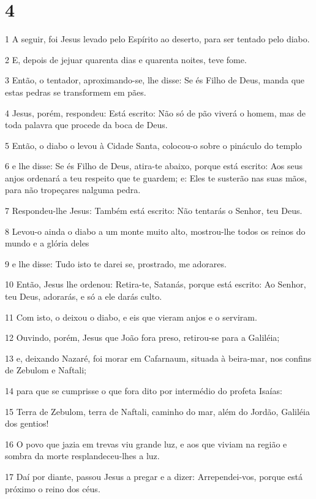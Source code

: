 \chapter{4}

\par 1 A seguir, foi Jesus levado pelo Espírito ao deserto, para ser tentado pelo diabo.
\par 2 E, depois de jejuar quarenta dias e quarenta noites, teve fome.
\par 3 Então, o tentador, aproximando-se, lhe disse: Se és Filho de Deus, manda que estas pedras se transformem em pães.
\par 4 Jesus, porém, respondeu: Está escrito: Não só de pão viverá o homem, mas de toda palavra que procede da boca de Deus.
\par 5 Então, o diabo o levou à Cidade Santa, colocou-o sobre o pináculo do templo
\par 6 e lhe disse: Se és Filho de Deus, atira-te abaixo, porque está escrito: Aos seus anjos ordenará a teu respeito que te guardem; e: Eles te susterão nas suas mãos, para não tropeçares nalguma pedra.
\par 7 Respondeu-lhe Jesus: Também está escrito: Não tentarás o Senhor, teu Deus.
\par 8 Levou-o ainda o diabo a um monte muito alto, mostrou-lhe todos os reinos do mundo e a glória deles
\par 9 e lhe disse: Tudo isto te darei se, prostrado, me adorares.
\par 10 Então, Jesus lhe ordenou: Retira-te, Satanás, porque está escrito: Ao Senhor, teu Deus, adorarás, e só a ele darás culto.
\par 11 Com isto, o deixou o diabo, e eis que vieram anjos e o serviram.
\par 12 Ouvindo, porém, Jesus que João fora preso, retirou-se para a Galiléia;
\par 13 e, deixando Nazaré, foi morar em Cafarnaum, situada à beira-mar, nos confins de Zebulom e Naftali;
\par 14 para que se cumprisse o que fora dito por intermédio do profeta Isaías:
\par 15 Terra de Zebulom, terra de Naftali, caminho do mar, além do Jordão, Galiléia dos gentios!
\par 16 O povo que jazia em trevas viu grande luz, e aos que viviam na região e sombra da morte resplandeceu-lhes a luz.
\par 17 Daí por diante, passou Jesus a pregar e a dizer: Arrependei-vos, porque está próximo o reino dos céus.
